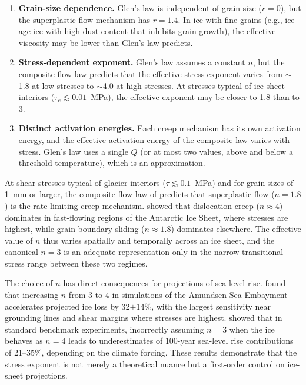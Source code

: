 \documentclass[11pt]{article}
\begin{document}
\begin{enumerate}
  \item \textbf{Grain-size dependence.}  Glen's law is independent of grain size ($r = 0$), but the superplastic flow mechanism has $r = 1.4$.  In ice with fine grains (e.g., ice-age ice with high dust content that inhibits grain growth), the effective viscosity may be lower than Glen's law predicts.

  \item \textbf{Stress-dependent exponent.}  Glen's law assumes a constant $n$, but the composite flow law predicts that the effective stress exponent varies from $\sim$1.8 at low stresses to $\sim$4.0 at high stresses.  At stresses typical of ice-sheet interiors ($\tau_e \lesssim 0.01$~MPa), the effective exponent may be closer to 1.8 than to 3.

  \item \textbf{Distinct activation energies.}  Each creep mechanism has its own activation energy, and the effective activation energy of the composite law varies with stress.  Glen's law uses a single $Q$ (or at most two values, above and below a threshold temperature), which is an approximation.
\end{enumerate}

\begin{tcolorbox}[
  colback=blue!5,
  colframe=blue!50!black,
  title={\textbf{Key point: implications for glacier modeling \cite{RanganathanMinchew2024,GetraerMorlighem2025,Martinetal2026}}}
]
At shear stresses typical of glacier interiors ($\tau \lesssim 0.1$~MPa) and for grain sizes of 1~mm or larger, the composite flow law of \cite{GoldsbyKohlstedt2001} predicts that superplastic flow ($n = 1.8$) is the rate-limiting creep mechanism.  \cite{RanganathanMinchew2024} showed that dislocation creep ($n \approx 4$) dominates in fast-flowing regions of the Antarctic Ice Sheet, where stresses are highest, while grain-boundary sliding ($n \approx 1.8$) dominates elsewhere.  The effective value of $n$ thus varies spatially and temporally across an ice sheet, and the canonical $n = 3$ is an adequate representation only in the narrow transitional stress range between these two regimes.

\medskip
\noindent The choice of $n$ has direct consequences for projections of sea-level rise.  \cite{GetraerMorlighem2025} found that increasing $n$ from 3 to 4 in simulations of the Amundsen Sea Embayment accelerates projected ice loss by 32$\pm$14\%, with the largest sensitivity near grounding lines and shear margins where stresses are highest.  \cite{Martinetal2026} showed that in standard benchmark experiments, incorrectly assuming $n = 3$ when the ice behaves as $n = 4$ leads to underestimates of 100-year sea-level rise contributions of 21--35\%, depending on the climate forcing.  These results demonstrate that the stress exponent is not merely a theoretical nuance but a first-order control on ice-sheet projections.
\end{tcolorbox}
\end{document}
